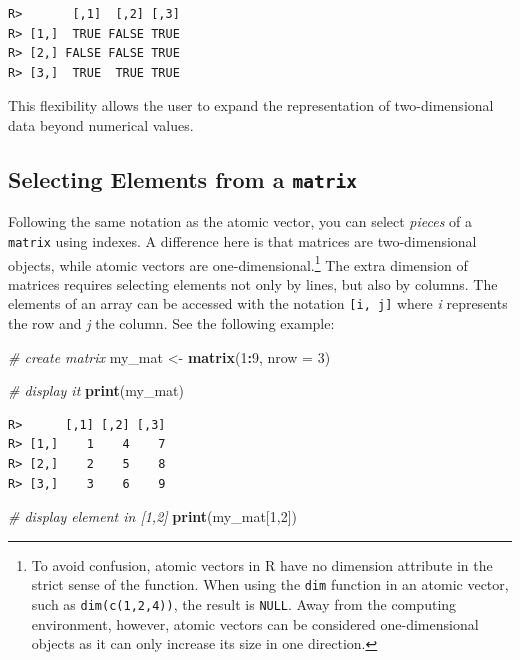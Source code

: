 \documentclass[
  12pt,
]{book}
\newenvironment{Shaded}{\begin{snugshade}}{\end{snugshade}}
\newcommand{\CommentTok}[1]{\textcolor[rgb]{0.37,0.37,0.37}{\textit{#1}}}
\newcommand{\DataTypeTok}[1]{\textcolor[rgb]{0.27,0.27,0.27}{#1}}
\newcommand{\DecValTok}[1]{\textcolor[rgb]{0.06,0.06,0.06}{#1}}
\newcommand{\KeywordTok}[1]{\textcolor[rgb]{0.27,0.27,0.27}{\textbf{#1}}}
\newcommand{\NormalTok}[1]{#1}
\newcommand{\OperatorTok}[1]{\textcolor[rgb]{0.43,0.43,0.43}{\textbf{#1}}}
\newcommand{\StringTok}[1]{\textcolor[rgb]{0.5,0.5,0.5}{#1}}
\begin{document}
\begin{verbatim}
R>       [,1]  [,2] [,3]
R> [1,]  TRUE FALSE TRUE
R> [2,] FALSE FALSE TRUE
R> [3,]  TRUE  TRUE TRUE
\end{verbatim}

This flexibility allows the user to expand the representation of two-dimensional data beyond numerical values.

\hypertarget{selecting-elements-from-a-matrix}{%
\subsection{\texorpdfstring{Selecting Elements from a \texttt{matrix}}{Selecting Elements from a matrix}}\label{selecting-elements-from-a-matrix}}

Following the same notation as the atomic vector, you can select \emph{pieces} of a \texttt{matrix} using indexes. A difference here is that matrices are two-dimensional objects, while atomic vectors are one-dimensional.\footnote{To avoid confusion, atomic vectors in R have no dimension attribute in the strict sense of the function. When using the \texttt{dim} function in an atomic vector, such as \texttt{dim(c(1,2,4))}, the result is \texttt{NULL}. Away from the computing environment, however, atomic vectors can be considered one-dimensional objects as it can only increase its size in one direction.} The extra dimension of matrices requires selecting elements not only by lines, but also by columns. The elements of an array can be accessed with the notation \texttt{{[}i,\ j{]}} where \emph{i} represents the row and \emph{j} the column. See the following example:

\begin{Shaded}
\begin{Highlighting}[]
\CommentTok{# create matrix}
\NormalTok{my_mat <-}\StringTok{ }\KeywordTok{matrix}\NormalTok{(}\DecValTok{1}\OperatorTok{:}\DecValTok{9}\NormalTok{, }\DataTypeTok{nrow =} \DecValTok{3}\NormalTok{)}

\CommentTok{# display it}
\KeywordTok{print}\NormalTok{(my_mat)}
\end{Highlighting}
\end{Shaded}

\begin{verbatim}
R>      [,1] [,2] [,3]
R> [1,]    1    4    7
R> [2,]    2    5    8
R> [3,]    3    6    9
\end{verbatim}

\begin{Shaded}
\begin{Highlighting}[]
\CommentTok{# display element in [1,2]}
\KeywordTok{print}\NormalTok{(my_mat[}\DecValTok{1}\NormalTok{,}\DecValTok{2}\NormalTok{])}
\end{Highlighting}
\end{Shaded}
\end{document}
